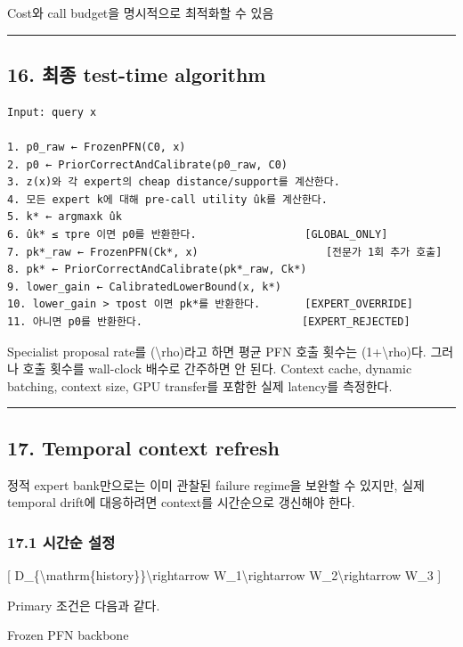 \par\noindent \textbullet\enspace Cost와 call budget을 명시적으로 최적화할 수 있음



\medskip\hrule\medskip
\subsection{16. 최종 test-time algorithm}

\begin{Verbatim}[breaklines=true,breakanywhere=true,fontsize=\scriptsize]
Input: query x

1. p0_raw ← FrozenPFN(C0, x)
2. p0 ← PriorCorrectAndCalibrate(p0_raw, C0)
3. z(x)와 각 expert의 cheap distance/support를 계산한다.
4. 모든 expert k에 대해 pre-call utility ûk를 계산한다.
5. k* ← argmaxk ûk
6. ûk* ≤ τpre 이면 p0를 반환한다.                 [GLOBAL_ONLY]
7. pk*_raw ← FrozenPFN(Ck*, x)                    [전문가 1회 추가 호출]
8. pk* ← PriorCorrectAndCalibrate(pk*_raw, Ck*)
9. lower_gain ← CalibratedLowerBound(x, k*)
10. lower_gain > τpost 이면 pk*를 반환한다.       [EXPERT_OVERRIDE]
11. 아니면 p0를 반환한다.                         [EXPERT_REJECTED]

\end{Verbatim}
Specialist proposal rate를 (\textbackslash{}rho)라고 하면 평균 PFN 호출 횟수는 (1+\allowbreak{}\textbackslash{}rho)다. 그러나 호출 횟수를 wall-clock 배수로 간주하면 안 된다. Context cache, dynamic batching, context size, GPU transfer를 포함한 실제 latency를 측정한다.


\medskip\hrule\medskip
\subsection{17. Temporal context refresh}
정적 expert bank만으로는 이미 관찰된 failure regime을 보완할 수 있지만, 실제 temporal drift에 대응하려면 context를 시간순으로 갱신해야 한다.

\subsubsection{17.1 시간순 설정}
[ D\_\allowbreak{}\{\textbackslash{}mathrm\{history\}\}\textbackslash{}rightarrow W\_\allowbreak{}1\textbackslash{}rightarrow W\_\allowbreak{}2\textbackslash{}rightarrow W\_\allowbreak{}3 ]

Primary 조건은 다음과 같다.

\par\noindent \textbullet\enspace Frozen PFN backbone



